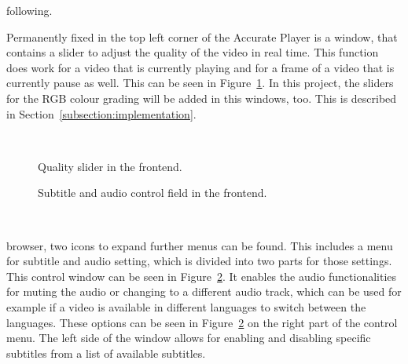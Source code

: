 \documentclass[../MasterThesis.tex]{subfiles}
\begin{document}
\begin{minipage}{0.5\textwidth}
%	
\vspace*{0.7em}
following.

	
Permanently fixed in the top left corner of the Accurate Player is a window, that contains a slider to adjust the quality of the video in real time. This function does work for a video that is currently playing and for a frame of a video that is currently pause as well. This can be seen in Figure~\ref{figure:qualityslider}. 
In this project, the sliders for the RGB colour grading will be added in this windows, too. This is described in Section~\ref{subsection:implementation}.

\end{minipage}\begin{minipage}{0.05\textwidth}
	\ 
\end{minipage}\begin{minipage}{0.45\textwidth}
	
\begin{figure}[H]
	\begin{center}
		\caption[Quality slider in the frontend.]{Quality slider in the frontend.}
		\label{figure:qualityslider} 
	\end{center}
\end{figure}
\end{minipage}

\vspace*{0.2em}

\begin{minipage}{0.5\textwidth}
	\begin{figure}[H]
		\begin{center}
			\caption[Subtitle and audio control field in the frontend.]{Subtitle and audio control field in the frontend.}
			\label{figure:subtitles}
		\end{center}
	\end{figure}
\vfill
\end{minipage}\begin{minipage}{0.05\textwidth}
	\ 
\end{minipage}\begin{minipage}{0.45\textwidth}
browser, two icons to expand further menus can be found. 
This includes a menu for subtitle and audio setting, which is divided into two parts for those settings. This control window can be seen in Figure~\ref{figure:subtitles}. It enables the audio functionalities for muting the audio or changing to a different audio track, which can be used for example if a video is available in different languages to switch between the languages. These options can be seen in Figure~\ref{figure:subtitles} on the right part of the control menu.
The left side of the window allows for enabling and disabling specific subtitles from a list of available subtitles. 
%
%
\end{minipage}
\end{document}
